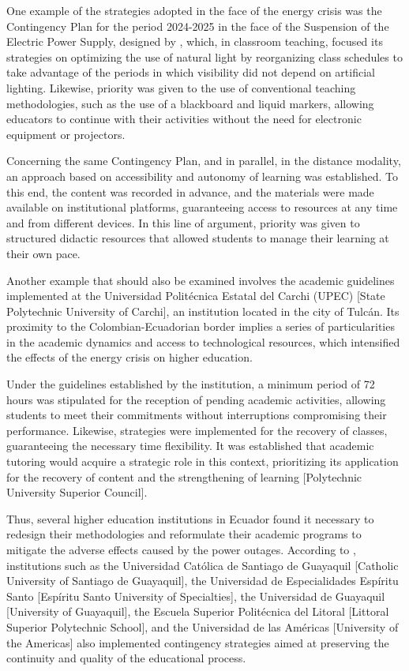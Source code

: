 \documentclass[english]{textolivre}
\begin{document}
One example of the strategies adopted in the face of the energy crisis was the Contingency Plan for the period 2024-2025 in the face of the Suspension of the Electric Power Supply, designed by \textcite{uce2024contingencia}, which, in classroom teaching, focused its strategies on optimizing the use of natural light by reorganizing class schedules to take advantage of the periods in which visibility did not depend on artificial lighting. Likewise, priority was given to the use of conventional teaching methodologies, such as the use of a blackboard and liquid markers, allowing educators to continue with their activities without the need for electronic equipment or projectors.

Concerning the same Contingency Plan, and in parallel, in the distance modality, an approach based on accessibility and autonomy of learning was established. To this end, the content was recorded in advance, and the materials were made available on institutional platforms, guaranteeing access to resources at any time and from different devices. In this line of argument, priority was given to structured didactic resources that allowed students to manage their learning at their own pace.

Another example that should also be examined involves the academic guidelines implemented at the Universidad Politécnica Estatal del Carchi (UPEC) [State Polytechnic University of Carchi], an institution located in the city of Tulcán. Its proximity to the Colombian-Ecuadorian border implies a series of particularities in the academic dynamics and access to technological resources, which intensified the effects of the energy crisis on higher education.

Under the guidelines established by the institution, a minimum period of 72 hours was stipulated for the reception of pending academic activities, allowing students to meet their commitments without interruptions compromising their performance. Likewise, strategies were implemented for the recovery of classes, guaranteeing the necessary time flexibility. It was established that academic tutoring would acquire a strategic role in this context, prioritizing its application for the recovery of content and the strengthening of learning \cite{csup2024resolucion230} [Polytechnic University Superior Council].

Thus, several higher education institutions in Ecuador found it necessary to redesign their methodologies and reformulate their academic programs to mitigate the adverse effects caused by the power outages. According to \textcite{cornejo2024universidades}, institutions such as the Universidad Católica de Santiago de Guayaquil [Catholic University of Santiago de Guayaquil], the Universidad de Especialidades Espíritu Santo [Espíritu Santo University of Specialties], the Universidad de Guayaquil [University of Guayaquil], the Escuela Superior Politécnica del Litoral [Littoral Superior Polytechnic School], and the Universidad de las Américas [University of the Americas] also implemented contingency strategies aimed at preserving the continuity and quality of the educational process.
\end{document}
